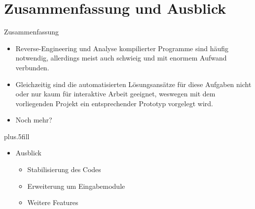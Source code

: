 \documentclass{beamer}
\begin{document}
\section*{Zusammenfassung und Ausblick}

\begin{frame}{Zusammenfassung}

  \begin{itemize}
  \item Reverse-Engineering und Analyse kompilierter Programme sind häufig notwendig,
	allerdings meist auch schwieig und mit enormem Aufwand verbunden.
  \item Gleichzeitig sind die automatisierten Lösungsansätze für diese Aufgaben nicht
	oder nur kaum für interaktive Arbeit geeignet, weswegen mit dem vorliegenden
	Projekt ein entsprechender Prototyp vorgelegt wird.
  \item Noch mehr?
  \end{itemize}
  
  \vskip0pt plus.5fill
  \begin{itemize}
  \item
    Ausblick
    \begin{itemize}
    \item Stabilisierung des Codes
    \item Erweiterung um Eingabemodule
    \item Weitere Features
    \end{itemize}
  \end{itemize}
\end{frame}
\end{document}
